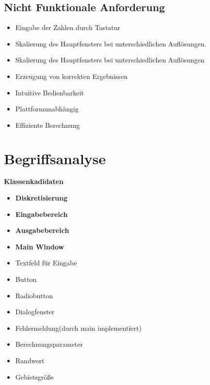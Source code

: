 \subsection{Nicht Funktionale Anforderung}
\begin{itemize}
\item Eingabe der Zahlen durch Tastatur
\item Skalierung des Hauptfensters bei unterschiedlichen Aufl\"osungen.
		\item Skalierung des Hauptfensters bei unterschiedlichen Aufl\"osungen
		\item Erzeugung von korrekten Ergebnissen
		\item Intuitive Bedienbarkeit
		\item Plattformunabh\"angig
		\item Effiziente Berechnung
\end{itemize}


\section{Begriffsanalyse}




\noindent \textbf{Klassenkadidaten} 
\begin{itemize}
	\item \textbf{Diskretisierung}
	\item \textbf{Eingabebereich}
	\item \textbf{Ausgabebereich}
	\item \textbf{Main Window}
	\item Textfeld f\"ur Eingabe
	\item Button
	\item Radiobutton
	\item Dialogfenster
	\item Fehlermeldung(durch main implementiert)
	\item Berechnungsparameter
	\item Randwert
	\item Gebietsgr\"o\ss e
\end{itemize}





